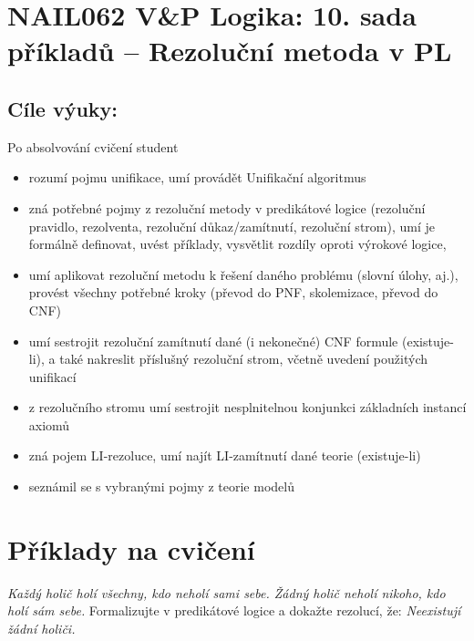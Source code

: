 \section*{NAIL062 V\&P Logika: 10. sada příkladů -- Rezoluční metoda v PL}


\subsection*{Cíle výuky:} Po absolvování cvičení student

    \begin{itemize}\setlength{\itemsep}{0pt}
        \item rozumí pojmu unifikace, umí provádět Unifikační algoritmus
        \item zná potřebné pojmy z rezoluční metody v predikátové logice (rezoluční pravidlo, rezolventa, rezoluční důkaz/zamítnutí, rezoluční strom), umí je formálně definovat, uvést příklady, vysvětlit rozdíly oproti výrokové logice, 
        \item umí aplikovat rezoluční metodu k řešení daného problému (slovní úlohy, aj.), provést všechny potřebné kroky (převod do PNF, skolemizace, převod do CNF)
        \item umí sestrojit rezoluční zamítnutí dané (i nekonečné) CNF formule (existuje-li), a také nakreslit příslušný rezoluční strom, včetně uvedení použitých unifikací
        \item z rezolučního stromu umí sestrojit nesplnitelnou konjunkci základních instancí axiomů
        \item zná pojem LI-rezoluce, umí najít LI-zamítnutí dané teorie (existuje-li)
        \item seznámil se s vybranými pojmy z teorie modelů
    \end{itemize}
    

\section*{Příklady na cvičení}


\begin{problem} 
    
    \emph{Každý holič holí všechny, kdo neholí sami sebe. Žádný holič neholí nikoho, kdo holí sám sebe.} Formalizujte v predikátové logice a dokažte rezolucí, že: \emph{Neexistují žádní holiči.}

\end{problem}


